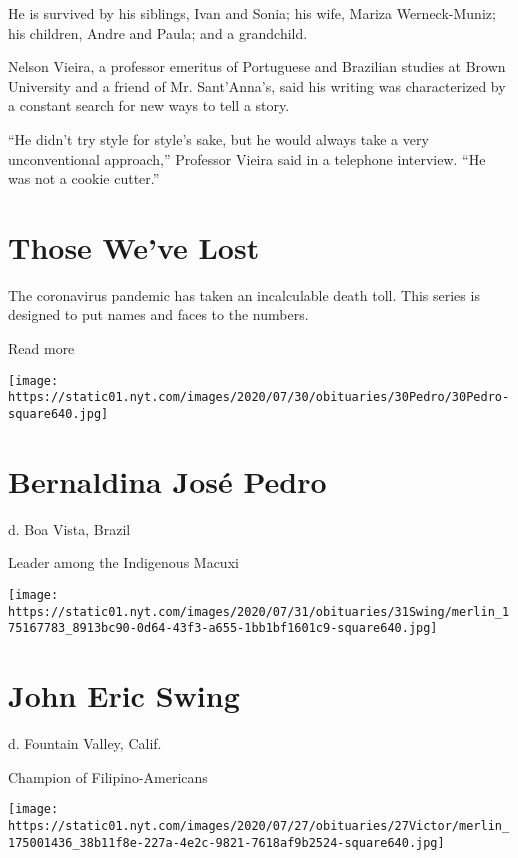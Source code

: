 He is survived by his siblings, Ivan and Sonia; his wife, Mariza
Werneck-Muniz; his children, Andre and Paula; and a grandchild.

Nelson Vieira, a professor emeritus of Portuguese and Brazilian studies
at Brown University and a friend of Mr. Sant'Anna's, said his writing
was characterized by a constant search for new ways to tell a story.

``He didn't try style for style's sake, but he would always take a very
unconventional approach,'' Professor Vieira said in a telephone
interview. ``He was not a cookie cutter.''

\href{https://www.nytimes.com/interactive/2020/obituaries/people-died-coronavirus-obituaries.html?action=click\&pgtype=Article\&state=default\&region=BELOW_MAIN_CONTENT\&context=covid_obits_promo}{}

\hypertarget{those-weve-lost}{%
\section{Those We've Lost}\label{those-weve-lost}}

The coronavirus pandemic has taken an incalculable death toll. This
series is designed to put names and faces to the numbers.

Read more

\texttt{[image: https://static01.nyt.com/images/2020/07/30/obituaries/30Pedro/30Pedro-square640.jpg]}

\hypertarget{bernaldina-josuxe9-pedro}{%
\section{Bernaldina José Pedro}\label{bernaldina-josuxe9-pedro}}

d. Boa Vista, Brazil

Leader among the Indigenous Macuxi

\texttt{[image: https://static01.nyt.com/images/2020/07/31/obituaries/31Swing/merlin\_175167783\_8913bc90-0d64-43f3-a655-1bb1bf1601c9-square640.jpg]}

\hypertarget{john-eric-swing}{%
\section{John Eric Swing}\label{john-eric-swing}}

d. Fountain Valley, Calif.

Champion of Filipino-Americans

\texttt{[image: https://static01.nyt.com/images/2020/07/27/obituaries/27Victor/merlin\_175001436\_38b11f8e-227a-4e2c-9821-7618af9b2524-square640.jpg]}

